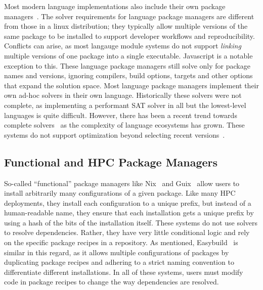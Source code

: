 Most modern language implementations also include their own package
managers~\cite{npm,pip,cargo,weizenbaum:pubgrub18}. The solver requirements for language
package managers are different from those in a linux distribution; they typically allow
multiple versions of the same package to be installed to support developer workflows and
reproducibility. Conflicts can arise, as most langauge module systems do not support
{\it linking} multiple versions of one package into a single executable. Javascript is a
notable exception to this. These language package managers still solve only for package
names and versions, ignoring compilers, build options, targets and other options that
expand the solution space. Most language package managers implement their own ad-hoc
solvers in their own language. Historically these solvers were not complete, as
implementing a performant SAT solver in all but the lowest-level languages is quite
difficult. However, there has been a recent trend towards complete
solvers~\cite{pip-new-resolver,weizenbaum:pubgrub18} as the complexity of language
ecosystems has grown. These systems do not support optimization beyond selecting recent
versions~\cite{abate2020dependency}.

\subsection{Functional and HPC Package Managers}

So-called ``functional'' package managers like
Nix~\cite{dolstra+:icfp08,dolstra+:lisa04} and Guix~\cite{courtes-guix-2015} allow users
to install arbitrarily many configurations of a given package. Like many HPC
deployments, they install each configuration to a unique prefix, but instead of a
human-readable name, they ensure that each installation gets a unique prefix by using a
hash of the bits of the installation itself. These systems do not use solvers to resolve
dependencies. Rather, they have very little conditional logic and rely on the specific
package recipes in a repository. As mentioned, Easybuild~\cite{hoste+:pyhpc12} is
similar in this regard, as it allows multiple configurations of packages by duplicating
package recipes and adhering to a strict naming convention to differentiate different
installations. In all of these systems, users must modify code in package recipes to
change the way dependencies are resolved.

